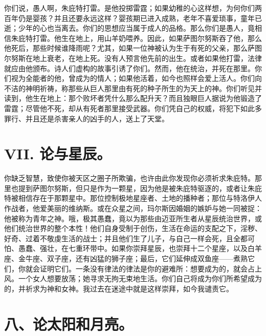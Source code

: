 你们说，愚人啊，朱庇特打雷。是他投掷雷霆；如果幼稚的心这样想，为何你们两百年仍是婴孩？并且还要永远这样？婴孩期已进入成熟，老年不喜爱琐事，童年已逝；少年的心也当离去。你们的思想应当属于成人的品格。那么你们是愚人，竟相信朱庇特打雷。他生在地上，用山羊奶喂养。因此，如果萨图尔努斯吞了他，那么他死后，那些时候谁降雨呢？尤其，如果一位神被认为生于有死的父亲，那么萨图尔努斯在地上衰老，在地上死。没有人预言他先前的出生。或者如果他打雷，法律就应由他颁布。诗人们虚构的故事引诱了你们。然而，他在统治，并死在那里。你们视为全能者的他，曾成为的情人；如果他活着，如今也照样会爱上活人。你们向不洁的神明祈祷，称那些从巨人那里由有死的种子所生的为天上的神。你们听见并读到，他生在地上：那个败坏者凭什么那么配升天？而且独眼巨人据说为他锻造了雷霆；尽管他不死，却从有死者那里接受武器。你们凭自己的权威，将犯下如此多罪行、并且还是杀害亲人的凶手的人，送上了天堂。\par


\section{VII. 论与星辰。}

你缺乏智慧，致使你被天区之圈子所欺骗，也许由此你发现你必须祈求朱庇特。那里也提到萨图尔努斯，但只是作为一颗星，因为他是被朱庇特驱逐的，或者让朱庇特被相信存在于那颗星中。那位控制极地星座者、土地的播种者；那位与特洛伊人作战者，他爱美丽的维纳斯。或在众星之间，玛尔斯因婚姻的嫉妒与她一同被捉：他被称为青年之神。哦，极其愚蠢，竟以为那些由迈亚所生者从星辰统治世界，或他们统治世界的整个本性！他们自身受制于创伤，生活在命运的支配之下，淫秽、好奇、过着不敬虔生活的战士；并且他们生了儿子，与自己一样会死，且全都可怕、愚蠢、强壮，在七重环带中。如果你崇拜星辰，也崇拜十二个星座，以及白羊座、金牛座、双子座，还有凶猛的狮子座；最后，它们延伸成双鱼座——煮熟它们，你就会证明它们。一条没有律法的律法是你的避难所：想要成为的，就会占上风。一个女人想要放荡；她寻求无拘无束地生活。你们自己将成为你们所希望成为的，并祈求为神和女神。我过去在迷途中就是这样崇拜，如今我谴责它。\par


\section{八、论太阳和月亮。}

